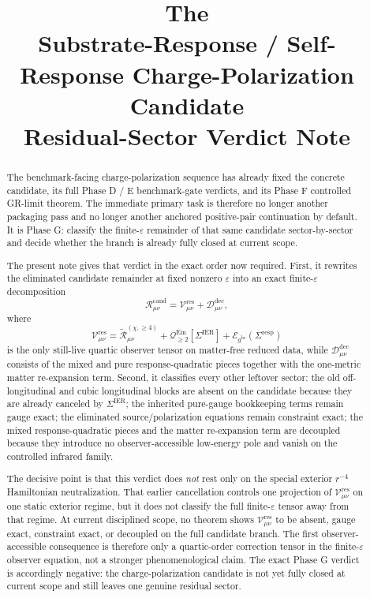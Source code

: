 \documentclass[11pt]{article}
\title{\textbf{The \TheoryName{}}\\[0.4em]
\large Substrate-Response / Self-Response Charge-Polarization Candidate\\
\large Residual-Sector Verdict Note}
\author{}
\date{}
\newcommand{\ObserverMetric}{g^{\mathrm{br}}}
\newcommand{\BaseShift}{\Sigma^{\mathrm{IER}}}
\newcommand{\ResponseShift}{\Sigma^{\mathrm{resp}}}
\newcommand{\ReLongFour}{\widetilde{\mathcal R}_{\mu\nu}^{(\chi,\ge 4)}}
\newcommand{\RemCand}{\mathcal R_{\mu\nu}^{\mathrm{cand}}}
\newcommand{\EinLin}{\mathcal E_{\ObserverMetric}}
\newcommand{\EinQuad}{\mathcal Q_{\ge 2}^{\mathrm{Ein}}}
\newcommand{\ResidualCore}{\mathcal V_{\mu\nu}^{\mathrm{res}}}
\newcommand{\ResidualDec}{\mathcal D_{\mu\nu}^{\mathrm{dec}}}
\newcommand{\epsIR}{\varepsilon}
\begin{document}
\maketitle

\begin{abstract}
The benchmark-facing charge-polarization sequence has already fixed the concrete candidate, its full Phase D / E benchmark-gate verdicts, and its Phase F controlled GR-limit theorem. The immediate primary task is therefore no longer another packaging pass and no longer another anchored positive-pair continuation by default. It is Phase G: classify the finite-\(\epsIR\) remainder of that same candidate sector-by-sector and decide whether the branch is already fully closed at current scope.

The present note gives that verdict in the exact order now required. First, it rewrites the eliminated candidate remainder at fixed nonzero \(\epsIR\) into an exact finite-\(\epsIR\) decomposition
\[
\RemCand
=
\ResidualCore+\ResidualDec,
\]
where
\[
\ResidualCore
=
\ReLongFour
+\EinQuad[\BaseShift]
+\EinLin(\ResponseShift)
\]
is the only still-live quartic observer tensor on matter-free reduced data, while \(\ResidualDec\) consists of the mixed and pure response-quadratic pieces together with the one-metric matter re-expansion term. Second, it classifies every other leftover sector: the old off-longitudinal and cubic longitudinal blocks are absent on the candidate because they are already canceled by \(\BaseShift\); the inherited pure-gauge bookkeeping terms remain gauge exact; the eliminated source/polarization equations remain constraint exact; the mixed response-quadratic pieces and the matter re-expansion term are decoupled because they introduce no observer-accessible low-energy pole and vanish on the controlled infrared family.

The decisive point is that this verdict does \emph{not} rest only on the special exterior \(r^{-4}\) Hamiltonian neutralization. That earlier cancellation controls one projection of \(\ResidualCore\) on one static exterior regime, but it does not classify the full finite-\(\epsIR\) tensor away from that regime. At current disciplined scope, no theorem shows \(\ResidualCore\) to be absent, gauge exact, constraint exact, or decoupled on the full candidate branch. The first observer-accessible consequence is therefore only a quartic-order correction tensor in the finite-\(\epsIR\) observer equation, not a stronger phenomenological claim. The exact Phase G verdict is accordingly negative: the charge-polarization candidate is not yet fully closed at current scope and still leaves one genuine residual sector.
\end{abstract}
\end{document}
